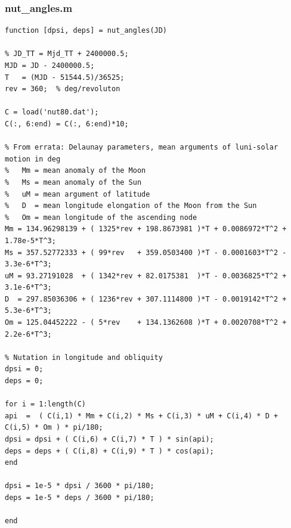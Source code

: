 \documentclass[conf]{new-aiaa}
\begin{document}
\subsubsection{nut\_angles.m}
\begin{lstlisting}
function [dpsi, deps] = nut_angles(JD)

% JD_TT = Mjd_TT + 2400000.5; 
MJD = JD - 2400000.5; 
T   = (MJD - 51544.5)/36525;
rev = 360;  % deg/revoluton 

C = load('nut80.dat'); 
C(:, 6:end) = C(:, 6:end)*10; 

% From errata: Delaunay parameters, mean arguments of luni-solar motion in deg
%   Mm = mean anomaly of the Moon
%   Ms = mean anomaly of the Sun
%   uM = mean argument of latitude
%   D  = mean longitude elongation of the Moon from the Sun 
%   Om = mean longitude of the ascending node  
Mm = 134.96298139 + ( 1325*rev + 198.8673981 )*T + 0.0086972*T^2 + 1.78e-5*T^3; 
Ms = 357.52772333 + ( 99*rev   + 359.0503400 )*T - 0.0001603*T^2 - 3.3e-6*T^3; 
uM = 93.27191028  + ( 1342*rev + 82.0175381  )*T - 0.0036825*T^2 + 3.1e-6*T^3; 
D  = 297.85036306 + ( 1236*rev + 307.1114800 )*T - 0.0019142*T^2 + 5.3e-6*T^3; 
Om = 125.04452222 - ( 5*rev    + 134.1362608 )*T + 0.0020708*T^2 + 2.2e-6*T^3; 

% Nutation in longitude and obliquity 
dpsi = 0;
deps = 0;

for i = 1:length(C)
api  =  ( C(i,1) * Mm + C(i,2) * Ms + C(i,3) * uM + C(i,4) * D + C(i,5) * Om ) * pi/180;
dpsi = dpsi + ( C(i,6) + C(i,7) * T ) * sin(api);
deps = deps + ( C(i,8) + C(i,9) * T ) * cos(api);
end

dpsi = 1e-5 * dpsi / 3600 * pi/180;
deps = 1e-5 * deps / 3600 * pi/180;

end
\end{lstlisting}
\end{document}
